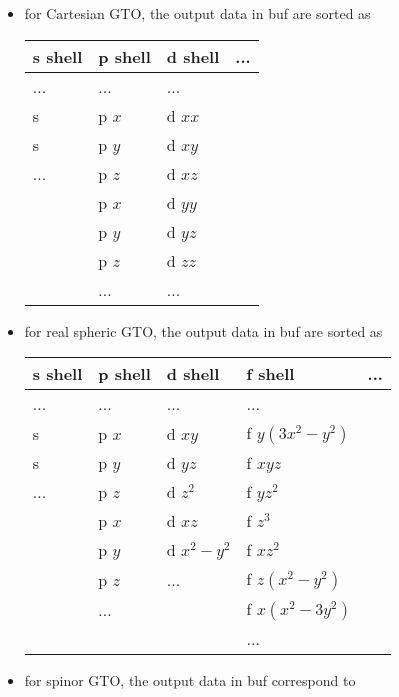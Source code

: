 \documentclass[]{article}
\begin{document}
\begin{itemize}
\itemsep1pt\parskip0pt
\item
  for Cartesian GTO, the output data in buf are sorted as\\

  \begin{tabular}{l|l|l|l}
  \hline
      s shell & p shell & d shell & ... \\
  \hline
      ...     & ...     & ...     & \\
      s       & p $x$   & d $xx$  & \\
      s       & p $y$   & d $xy$  & \\
      ...     & p $z$   & d $xz$  & \\
              & p $x$   & d $yy$  & \\
              & p $y$   & d $yz$  & \\
              & p $z$   & d $zz$  & \\
              & ...     & ...     & \\
  \hline
  \end{tabular}
\item
  for real spheric GTO, the output data in buf are sorted as\\

  \begin{tabular}{l|l|l|l|l}
  \hline
      s shell & p shell & d shell     & f shell         & ... \\
  \hline
      ...     & ...     & ...         & ...             & \\
      s       & p $x$   & d $xy     $ & f $y(3x^2-y^2)$ & \\
      s       & p $y$   & d $yz     $ & f $xyz        $ & \\
      ...     & p $z$   & d $z^2    $ & f $yz^2       $ & \\
              & p $x$   & d $xz     $ & f $z^3        $ & \\
              & p $y$   & d $x^2-y^2$ & f $xz^2       $ & \\
              & p $z$   & ...         & f $z(x^2-y^2) $ & \\
              & ...     &             & f $x(x^2-3y^2)$ & \\
              &         &             & ...             & \\
  \hline
  \end{tabular}
\item
  for spinor GTO, the output data in buf correspond to\\


\end{itemize}
\end{document}
